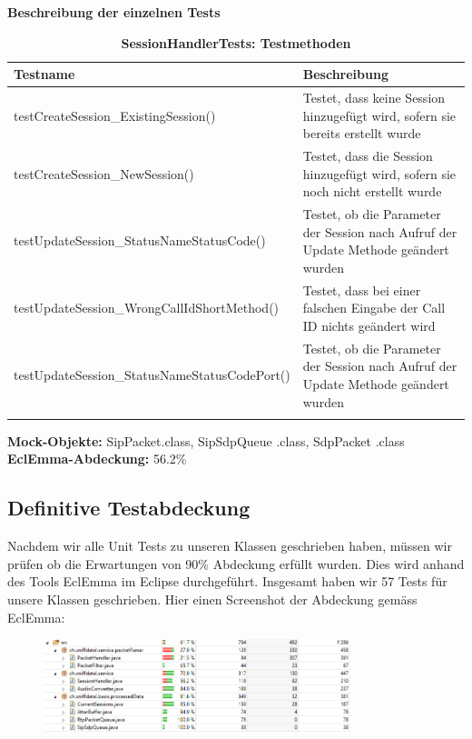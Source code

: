 \documentclass[a4,12pt]{scrartcl}
\begin{document}
\textbf{Beschreibung der einzelnen Tests}
\begin{longtable}{ p{9cm} p{6.5cm} }     
    {Testname} & {Beschreibung}\\ \midrule
    testCreateSession\_ExistingSession() & Testet, dass keine Session hinzugefügt wird, sofern sie bereits erstellt wurde\\ \addlinespace
    testCreateSession\_NewSession() & Testet, dass die Session hinzugefügt wird, sofern sie noch nicht erstellt wurde\\ \addlinespace
    testUpdateSession\_StatusNameStatusCode() & Testet, ob die Parameter der Session nach Aufruf der Update Methode geändert wurden\\ \addlinespace
    testUpdateSession\_WrongCallIdShortMethod() & Testet, dass bei einer falschen Eingabe der Call ID nichts geändert wird\\ \addlinespace
    testUpdateSession\_StatusNameStatusCodePort() & Testet, ob die Parameter der Session nach Aufruf der Update Methode geändert wurden\\
\caption{\textbf{SessionHandlerTests: Testmethoden}}
\end{longtable}

\noindent \textbf{Mock-Objekte:} SipPacket.class, SipSdpQueue .class, SdpPacket .class\\
\textbf{EclEmma-Abdeckung:} 56.2\%

\subsection{Definitive Testabdeckung}
Nachdem wir alle Unit Tests zu unseren Klassen geschrieben haben, müssen wir prüfen ob die Erwartungen von 90\% Abdeckung erfüllt wurden. Dies wird anhand des Tools EclEmma im Eclipse durchgeführt. Insgesamt haben wir 57 Tests für unsere Klassen geschrieben. Hier einen Screenshot der Abdeckung gemäss EclEmma: 
\begin{figure} [H]
	\begin{center}
	\includegraphics[width=0.80\textwidth]{./pictures/TotalCoverage.png}
	\label{Bild Referenz}
	\end{center}
\end{figure}
\end{document}
